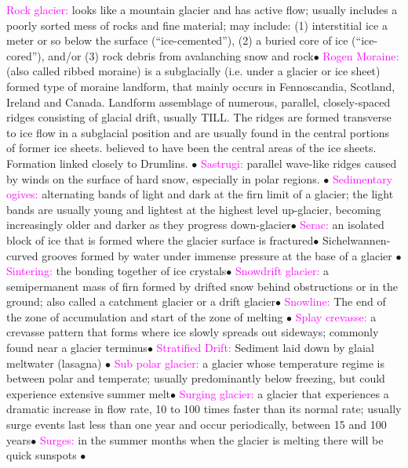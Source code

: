 \documentclass{article}
\newcommand{\ddd}{$\bullet$}
\newcommand{\pink}[1]{\textcolor{magenta}{#1}}
\newcommand{\vocab}[1]{{\pink{#1}}}
\begin{document}
\begin{multicols*}{4}
		\vocab{        Rock glacier: } looks like a mountain glacier and has active flow; usually includes a poorly sorted mess of rocks and fine material; may include: (1) interstitial ice a meter or so below the surface (“ice-cemented”), (2) a buried core of ice (“ice-cored”), and/or (3) rock debris from avalanching snow and rock\ddd
		\vocab{        Rogen Moraine: }(also called ribbed moraine) is a subglacially (i.e. under a glacier or ice sheet) formed type of moraine landform, that mainly occurs in Fennoscandia, Scotland, Ireland and Canada. Landform assemblage of numerous, parallel, closely-spaced ridges consisting of glacial drift, usually TILL. The ridges are formed transverse to ice flow in a subglacial position and are usually found in the central portions of former ice sheets. believed to have been the central areas of the ice sheets. Formation linked closely to Drumlins. \ddd
		\vocab{        Sastrugi: } parallel wave-like ridges caused by winds on the surface of hard snow, especially in polar regions. \ddd
		\vocab{        Sedimentary ogives: } alternating bands of light and dark at the firn limit of a glacier; the light bands are usually young and lightest at the highest level up-glacier, becoming increasingly older and darker as they progress down-glacier\ddd
		\vocab{        Serac: } an isolated block of ice that is formed where the glacier surface is fractured\ddd
		\vocab{ }        Sichelwannen- curved grooves formed by water under immense pressure at the base of a glacier \ddd
		\vocab{        Sintering: } the bonding together of ice crystals\ddd
		\vocab{        Snowdrift glacier: } a semipermanent mass of firn formed by drifted snow behind obstructions or in the ground; also called a catchment glacier or a drift glacier\ddd
		\vocab{Snowline: } The end of the zone of accumulation and start of the zone of melting \ddd
		\vocab{        Splay crevasse: } a crevasse pattern that forms where ice slowly spreads out sideways; commonly found near a glacier terminus\ddd
		\vocab{Stratified Drift: } Sediment laid down by glaial meltwater (lasagna) \ddd
		\vocab{        Sub polar glacier: } a glacier whose temperature regime is between polar and temperate; usually predominantly below freezing, but could experience extensive summer melt\ddd
		\vocab{        Surging glacier: } a glacier that experiences a dramatic increase in flow rate, 10 to 100 times faster than its normal rate; usually surge events last less than one year and occur periodically, between 15 and 100 years\ddd
		\vocab{Surges: } in the summer months when the glacier is melting there will be quick sunspots \ddd

\end{multicols*}
\end{document}
